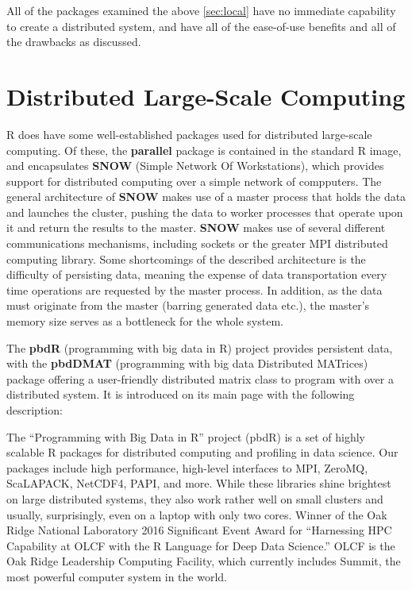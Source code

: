 All of the packages examined the above \ref{sec:local} have no
immediate capability to create a distributed system, and have all of the
ease-of-use benefits and all of the drawbacks as discussed.

\hypertarget{distributed-large-scale-computing}{%
	\section{Distributed Large-Scale Computing}\label{distributed-large-scale-computing}}

R does have some well-established packages used for distributed
large-scale computing. Of these, the \textbf{parallel} package is
contained in the standard R image, and encapsulates \textbf{SNOW}
(Simple Network Of Workstations), which provides support for distributed
computing over a simple network of compputers. The general architecture
of \textbf{SNOW} makes use of a master process that holds the data and
launches the cluster, pushing the data to worker processes that operate
upon it and return the results to the master. \textbf{SNOW} makes use of
several different communications mechanisms, including sockets or the
greater MPI distributed computing library. Some shortcomings of the
described architecture is the difficulty of persisting data, meaning the
expense of data transportation every time operations are requested by
the master process. In addition, as the data must originate from the
master (barring generated data etc.), the master's memory size serves as
a bottleneck for the whole system.

The \textbf{pbdR} (programming with big data in R) project provides
persistent data, with the \textbf{pbdDMAT} (programming with big data
Distributed MATrices) package offering a user-friendly distributed
matrix class to program with over a distributed system. It is introduced
on its main page with the following description:

\begin{displayquote}
	The ``Programming with Big Data in R'' project (pbdR) is a set of highly
	scalable R packages for distributed computing and profiling in data
	science. Our packages include high performance, high-level interfaces to
	MPI, ZeroMQ, ScaLAPACK, NetCDF4, PAPI, and more. While these libraries
	shine brightest on large distributed systems, they also work rather well
	on small clusters and usually, surprisingly, even on a laptop with only
	two cores. Winner of the Oak Ridge National Laboratory 2016 Significant
	Event Award for ``Harnessing HPC Capability at OLCF with the R Language
	for Deep Data Science.'' OLCF is the Oak Ridge Leadership Computing
	Facility, which currently includes Summit, the most powerful computer
	system in the world.
\end{displayquote}\cite{pbdR2012}

